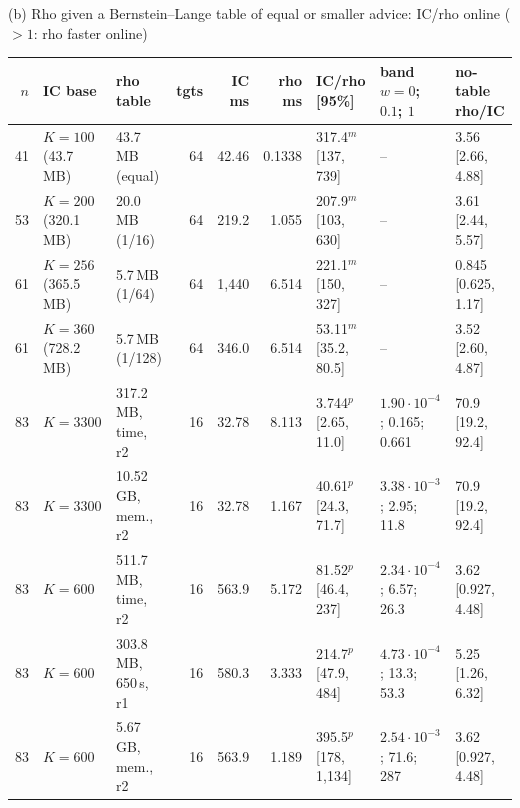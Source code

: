(b) Rho given a Bernstein--Lange table of equal or smaller advice: IC/rho online ($>1$: rho faster online)\\[2pt]
\begin{tabular}{@{}rllrrrlll@{}}
\toprule
$n$ & IC base & rho table & tgts & IC ms & rho ms & IC/rho [95\%] & band $w=0$; $0.1$; $1$ & no-table rho/IC \\
\midrule
41 & $K=100$ (43.7\,MB) & 43.7\,MB (equal) & 64 & 42.46 & 0.1338 & 317.4$^{m}$ [137, 739] & -- & 3.56 [2.66, 4.88] \\
53 & $K=200$ (320.1\,MB) & 20.0\,MB (1/16) & 64 & 219.2 & 1.055 & 207.9$^{m}$ [103, 630] & -- & 3.61 [2.44, 5.57] \\
61 & $K=256$ (365.5\,MB) & 5.7\,MB (1/64) & 64 & 1{,}440 & 6.514 & 221.1$^{m}$ [150, 327] & -- & 0.845 [0.625, 1.17] \\
61 & $K=360$ (728.2\,MB) & 5.7\,MB (1/128) & 64 & 346.0 & 6.514 & 53.11$^{m}$ [35.2, 80.5] & -- & 3.52 [2.60, 4.87] \\
83 & $K=3300$ & 317.2\,MB, time, r2 & 16 & 32.78 & 8.113 & 3.744$^{p}$ [2.65, 11.0] & $1.90\cdot10^{-4}$; 0.165; 0.661 & 70.9 [19.2, 92.4] \\
83 & $K=3300$ & 10.52\,GB, mem., r2 & 16 & 32.78 & 1.167 & 40.61$^{p}$ [24.3, 71.7] & $3.38\cdot10^{-3}$; 2.95; 11.8 & 70.9 [19.2, 92.4] \\
83 & $K=600$ & 511.7\,MB, time, r2 & 16 & 563.9 & 5.172 & 81.52$^{p}$ [46.4, 237] & $2.34\cdot10^{-4}$; 6.57; 26.3 & 3.62 [0.927, 4.48] \\
83 & $K=600$ & 303.8\,MB, 650\,s, r1 & 16 & 580.3 & 3.333 & 214.7$^{p}$ [47.9, 484] & $4.73\cdot10^{-4}$; 13.3; 53.3 & 5.25 [1.26, 6.32] \\
83 & $K=600$ & 5.67\,GB, mem., r2 & 16 & 563.9 & 1.189 & 395.5$^{p}$ [178, 1{,}134] & $2.54\cdot10^{-3}$; 71.6; 287 & 3.62 [0.927, 4.48] \\
\bottomrule
\end{tabular}
